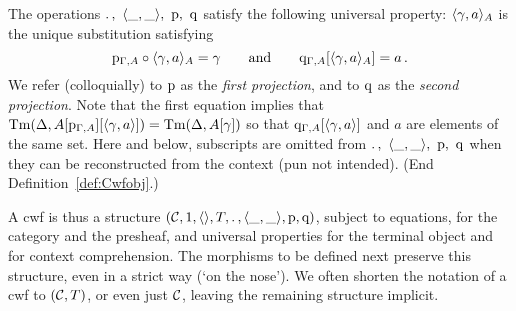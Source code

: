 \documentclass{lmcs}
\begin{document}
\begin{definition}
The operations  ${.\,},~\langle \_,\_ \rangle,~\mathrm{p},~\mathrm{q}$
satisfy the following universal property:
$\langle \gamma, a \rangle_A$ is the unique substitution satisfying
\[
\mathrm{p}_{\Gamma, A} \circ \langle \gamma, a \rangle_A = \gamma
\qquad \text{and}\qquad
\mathrm{q}_{\Gamma, A} [\langle \gamma, a \rangle_A] = a\,.
\]
We refer (colloquially) to $\mathrm{p}$ as the \emph{first projection},
and to $\mathrm{q}$ as the \emph{second projection}. %
{Note that the first equation implies that
$\mathrm{Tm}(\Delta,A[\mathrm{p}_{\Gamma,A}][\langle \gamma, a \rangle]) = \mathrm{Tm}(\Delta,A[\gamma])$
so that $\mathrm{q}_{\Gamma, A} [\langle \gamma, a \rangle]$ and $a$ are elements of the same set.}
Here and below, subscripts are omitted from ${.\,},~\langle \_,\_ \rangle,~\mathrm{p},~\mathrm{q}$
when they can be reconstructed from the context (pun not intended).
(End Definition~\ref{def:Cwfobj}.)
\end{definition}



A cwf is thus a structure $({\mathcal C},1,\langle  \rangle,T,.\, , \langle \_,\_ \rangle,\mathrm{p}, \mathrm{q})$, 
subject to equations, for the category and the presheaf, and universal
properties for the terminal object and for context comprehension. 
The morphisms to be defined next preserve this structure,
even in a strict way (`on the nose').
We often shorten the notation of a cwf to $({\mathcal C},T)$, or even just ${\mathcal C}$, 
leaving the remaining structure implicit.
\end{document}
